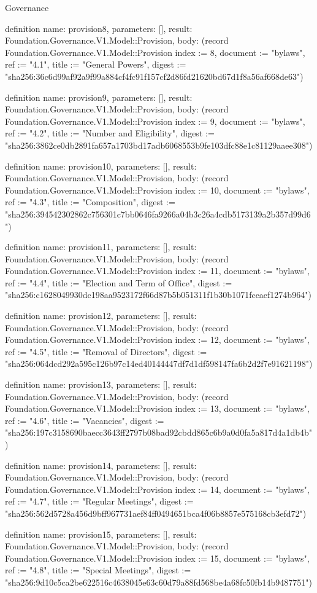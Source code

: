 \begin{lexlean}{Governance}
\begin{semanticmodule}
definition{
  name: provision8,
  parameters: [],
  result: Foundation.Governance.V1.Model::Provision,
  body: (record Foundation.Governance.V1.Model::Provision {index := 8, document := "bylaws", ref := "4.1", title := "General Powers", digest := "sha256:36c6d99af92a9f99a884cf4fc91f157cf2d86fd21620bd67d1f8a56af668de63"})
}

definition{
  name: provision9,
  parameters: [],
  result: Foundation.Governance.V1.Model::Provision,
  body: (record Foundation.Governance.V1.Model::Provision {index := 9, document := "bylaws", ref := "4.2", title := "Number and Eligibility", digest := "sha256:3862ce0db2891fa657a1703bd17adb6068553b9fe103dfc88e1c81129aaee308"})
}

definition{
  name: provision10,
  parameters: [],
  result: Foundation.Governance.V1.Model::Provision,
  body: (record Foundation.Governance.V1.Model::Provision {index := 10, document := "bylaws", ref := "4.3", title := "Composition", digest := "sha256:394542302862c756301c7bb0646fa9266a04b3c26a4cdb5173139a2b357d99d6"})
}

definition{
  name: provision11,
  parameters: [],
  result: Foundation.Governance.V1.Model::Provision,
  body: (record Foundation.Governance.V1.Model::Provision {index := 11, document := "bylaws", ref := "4.4", title := "Election and Term of Office", digest := "sha256:c1628049930dc198aa9523172f66d87b5b051311f1b30b1071fceaef1274b964"})
}

definition{
  name: provision12,
  parameters: [],
  result: Foundation.Governance.V1.Model::Provision,
  body: (record Foundation.Governance.V1.Model::Provision {index := 12, document := "bylaws", ref := "4.5", title := "Removal of Directors", digest := "sha256:064dcd292a595c126b97c14ed40144447df7d1df598147fa6b2d2f7e91621198"})
}

definition{
  name: provision13,
  parameters: [],
  result: Foundation.Governance.V1.Model::Provision,
  body: (record Foundation.Governance.V1.Model::Provision {index := 13, document := "bylaws", ref := "4.6", title := "Vacancies", digest := "sha256:197c3158690baecc3643ff2797b08bad92cbdd865c6b9a0d0fa5a817d4a1db4b"})
}

definition{
  name: provision14,
  parameters: [],
  result: Foundation.Governance.V1.Model::Provision,
  body: (record Foundation.Governance.V1.Model::Provision {index := 14, document := "bylaws", ref := "4.7", title := "Regular Meetings", digest := "sha256:562d5728a456d9bff967731aef84ff0494651bca4f06b8857e575168cb3efd72"})
}

definition{
  name: provision15,
  parameters: [],
  result: Foundation.Governance.V1.Model::Provision,
  body: (record Foundation.Governance.V1.Model::Provision {index := 15, document := "bylaws", ref := "4.8", title := "Special Meetings", digest := "sha256:9d10c5ca2be622516c4638045e63c60d79a88fd568be4a68fc50fb14b9487751"})
}


\end{semanticmodule}
\end{lexlean}

